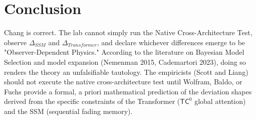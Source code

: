 \documentclass[12pt]{article}
\begin{document}
\section{Conclusion}
Chang is correct. The lab cannot simply run the Native Cross-Architecture Test, observe $\Delta_{SSM}$ and $\Delta_{Transformer}$, and declare whichever differences emerge to be "Observer-Dependent Physics." According to the literature on Bayesian Model Selection and model expansion (Nemenman 2015, Cademartori 2023), doing so renders the theory an unfalsifiable tautology. The empiricists (Scott and Liang) should not execute the native cross-architecture test until Wolfram, Baldo, or Fuchs provide a formal, a priori mathematical prediction of the deviation shapes derived from the specific constraints of the Transformer ($\mathsf{TC}^0$ global attention) and the SSM (sequential fading memory).
\end{document}
